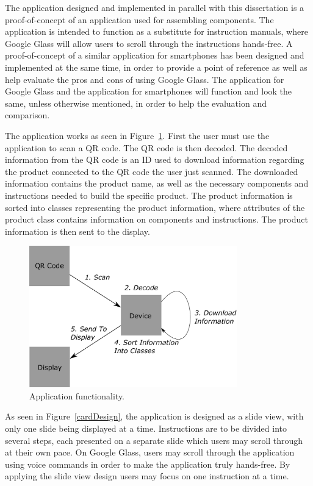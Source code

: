 The application designed and implemented in parallel with this dissertation is a proof-of-concept of an application used for assembling components. The application is intended to function as a substitute for  instruction manuals, where Google Glass will allow users to scroll through the instructions hands-free. A proof-of-concept of a similar application for smartphones has been designed and implemented at the same time, in order to provide a point of reference as well as help evaluate the pros and cons of using Google Glass. The application for Google Glass and the application for smartphones will function and look the same, unless otherwise mentioned, in order to help the evaluation and comparison.

The application works as seen in Figure~\ref{projectmap}. First the user must use the application to scan a QR code. The QR code is then decoded. The decoded information from the QR code is an ID used to download information regarding the product connected to the QR code the user just scanned. The downloaded information contains the product name, as well as the necessary components and instructions needed to build the specific product. The product information is sorted into classes representing the product information, where attributes of the product class contains information on components and instructions.  The product information is then sent to the display.

	\begin{figure}[ht!]
		\centering
		\includegraphics[width=90mm]{images/projectmap4}
		\caption{Application functionality.}
		\label{projectmap}
	\end{figure}

As seen in Figure~\ref{cardDesign}, the application is designed as a slide view, with only one slide being displayed at a time. Instructions are to be divided into several steps, each presented on a separate slide which users may scroll through at their own pace. On Google Glass, users may scroll through the application using voice commands in order to make the application truly hands-free. By applying the slide view design users may focus on one instruction at a time. %

